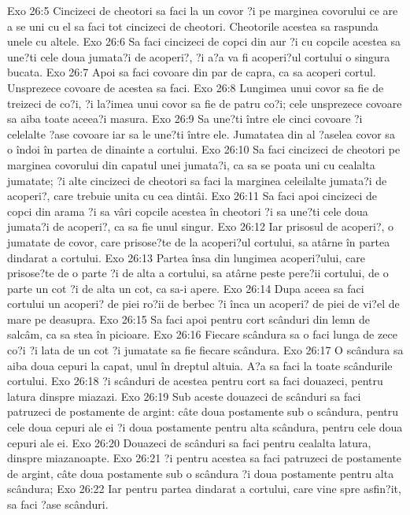 Exo 26:5  Cincizeci de cheotori sa faci la un covor ?i pe marginea covorului ce are a se uni cu el sa faci tot cincizeci de cheotori. Cheotorile acestea sa raspunda unele cu altele.
Exo 26:6  Sa faci cincizeci de copci din aur ?i cu copcile acestea sa une?ti cele doua jumata?i de acoperi?, ?i a?a va fi acoperi?ul cortului o singura bucata.
Exo 26:7  Apoi sa faci covoare din par de capra, ca sa acoperi cortul. Unsprezece covoare de acestea sa faci.
Exo 26:8  Lungimea unui covor sa fie de treizeci de co?i, ?i la?imea unui covor sa fie de patru co?i; cele unsprezece covoare sa aiba toate aceea?i masura.
Exo 26:9  Sa une?ti între ele cinci covoare ?i celelalte ?ase covoare iar sa le une?ti între ele. Jumatatea din al ?aselea covor sa o îndoi în partea de dinainte a cortului.
Exo 26:10  Sa faci cincizeci de cheotori pe marginea covorului din capatul unei jumata?i, ca sa se poata uni cu cealalta jumatate; ?i alte cincizeci de cheotori sa faci la marginea celeilalte jumata?i de acoperi?, care trebuie unita cu cea dintâi.
Exo 26:11  Sa faci apoi cincizeci de copci din arama ?i sa vâri copcile acestea în cheotori ?i sa une?ti cele doua jumata?i de acoperi?, ca sa fie unul singur.
Exo 26:12  Iar prisosul de acoperi?, o jumatate de covor, care prisose?te de la acoperi?ul cortului, sa atârne în partea dindarat a cortului.
Exo 26:13  Partea însa din lungimea acoperi?ului, care prisose?te de o parte ?i de alta a cortului, sa atârne peste pere?ii cortului, de o parte un cot ?i de alta un cot, ca sa-i apere.
Exo 26:14  Dupa aceea sa faci cortului un acoperi? de piei ro?ii de berbec ?i înca un acoperi? de piei de vi?el de mare pe deasupra.
Exo 26:15  Sa faci apoi pentru cort scânduri din lemn de salcâm, ca sa stea în picioare.
Exo 26:16  Fiecare scândura sa o faci lunga de zece co?i ?i lata de un cot ?i jumatate sa fie fiecare scândura.
Exo 26:17  O scândura sa aiba doua cepuri la capat, unul în dreptul altuia. A?a sa faci la toate scândurile cortului.
Exo 26:18  ?i scânduri de acestea pentru cort sa faci douazeci, pentru latura dinspre miazazi.
Exo 26:19  Sub aceste douazeci de scânduri sa faci patruzeci de postamente de argint: câte doua postamente sub o scândura, pentru cele doua cepuri ale ei ?i doua postamente pentru alta scândura, pentru cele doua cepuri ale ei.
Exo 26:20  Douazeci de scânduri sa faci pentru cealalta latura, dinspre miazanoapte.
Exo 26:21  ?i pentru acestea sa faci patruzeci de postamente de argint, câte doua postamente sub o scândura ?i doua postamente pentru alta scândura;
Exo 26:22  Iar pentru partea dindarat a cortului, care vine spre asfin?it, sa faci ?ase scânduri.
